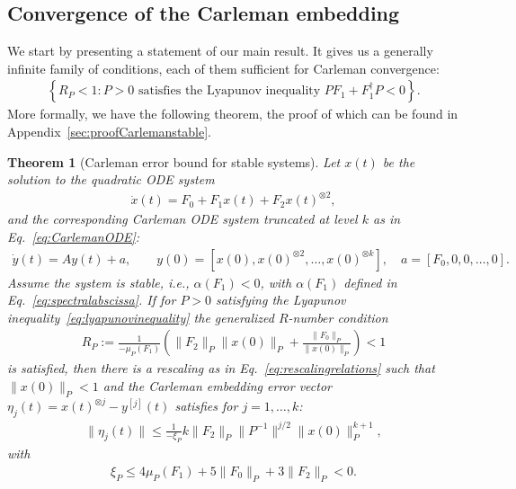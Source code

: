 \documentclass[superscriptaddress,onecolumn,nofootinbib,longbibliography,a4paper,accepted=2026-09-29]{quantumarticle}
\theoremstyle{plain}
\newtheorem{thm}{Theorem}
\theoremstyle{definition}
\numberwithin{thm}{section}
\numberwithin{assumption}{section}
\numberwithin{lemma}{section}
\numberwithin{prop}{section}
\numberwithin{cor}{section}
\numberwithin{definition}{section}
\numberwithin{rmk}{section}
\numberwithin{equation}{section}
\begin{document}

\subsection{Convergence of the Carleman embedding}
\label{sec:stableconvergence}

We start by presenting a statement of our main result. It gives us a generally infinite family of conditions, each of them sufficient for Carleman convergence:
\begin{align}
    \left\{R_P<1 : P >0 \textrm{ satisfies the Lyapunov inequality } P F_1 + F_1^\dag P < 0\right\}.
\end{align}
More formally, we have the following theorem, the proof of which can be found in  Appendix~\ref{sec:proofCarlemanstable}.

\begin{thm}[Carleman error bound for stable systems]
\label{thm:Carlemanstable}
Let $x(t)$ be the solution to the quadratic ODE system
\begin{align}
\dot{x}(t) = F_0 + F_1 x(t)+ F_2x(t)^{\otimes 2},
\end{align}
and the corresponding Carleman ODE system truncated at level $k$ as in Eq.~\eqref{eq:CarlemanODE}:
\begin{align}
    \dot{y}(t) = Ay(t) +a, \quad \quad y(0) = [x(0), x(0)^{\otimes 2}, \dots, x(0)^{\otimes k}], \quad   a = [F_0, 0, 0, \dots , 0].
\end{align}
 Assume the system is stable, i.e., $\alpha(F_1)<0$, with $\alpha(F_1)$ defined in Eq.~\eqref{eq:spectralabscissa}. If for $P>0$ satisfying the Lyapunov inequality~\eqref{eq:lyapunovinequality} the generalized $R$-number condition  
\begin{align}
    R_P :=  \frac{1}{-\mu_P(F_{1})} \left (  \|F_{2}\|_P \|x(0)\|_P + \frac{\|F_0\|_P}{ \|x(0)\|_P} \right )<1
\end{align}
is satisfied, then there is a rescaling as in Eq.~\eqref{eq:rescalingrelations} such that $\| x(0) \|_P<1$ and the Carleman embedding error vector $\eta_j(t) = x(t)^{\otimes j} - y^{[j]}(t)$ satisfies for $j=1, \dots, k$:
  \begin{align}
  \label{eq:Carlemanerrorbound}
  \|\eta_j(t)\|  \leq \frac{1}{-\xi_P } k \|F_2\|_P \| P^{-1}\|^{j/2} \| x(0)\|_P^{k+1},
\end{align}
 with
\begin{align}
\xi_P \leq  4 \mu_P(F_1) + 5 \| F_0\|_P + 3 \| F_2\|_P <0.
\end{align}
\end{thm}
\end{document}
